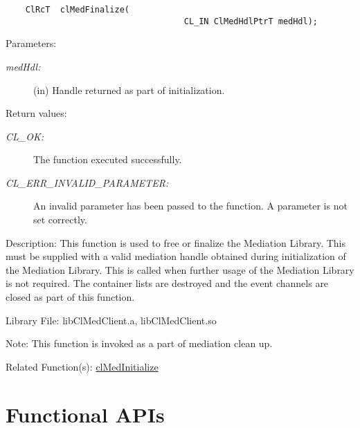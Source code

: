 \begin{flushleft}
\begin{Desc}
\footnotesize\begin{verbatim}    ClRcT  clMedFinalize(
                          			CL_IN ClMedHdlPtrT medHdl);
\end{verbatim}
\normalsize
\end{Desc}
\begin{Desc}
\item[Parameters:]
\begin{description}
\item[{\em med\-Hdl:}](in) Handle returned as part of initialization.\end{description}
\end{Desc}
\begin{Desc}
\item[Return values:]
\begin{description}
\item[{\em CL\_\-OK:}]The function executed successfully. 
\item[{\em CL\_\-ERR\_\-INVALID\_\-PARAMETER:}]An invalid parameter has been passed to the function. A parameter is not set correctly.\end{description}
\end{Desc}
\begin{Desc}
\item[Description:]This function is used to free or finalize the Mediation Library. This must be supplied with a valid mediation handle obtained during 
initialization of the Mediation Library. This is called when further usage of the Mediation Library is not required. The container lists are destroyed 
and the event channels are closed as part of this function.\end{Desc}
\begin{Desc}
\item[Library File:]lib\-Cl\-Med\-Client.a, lib\-Cl\-Med\-Client.so\end{Desc}
\begin{Desc}
\item[Note:]This function is invoked as a part of mediation clean up.\end{Desc}
\begin{Desc}
\item[Related Function(s):]\hyperlink{pagemed101}{cl\-Med\-Initialize} \end{Desc}
\newpage


\section{Functional APIs}

\end{flushleft}
